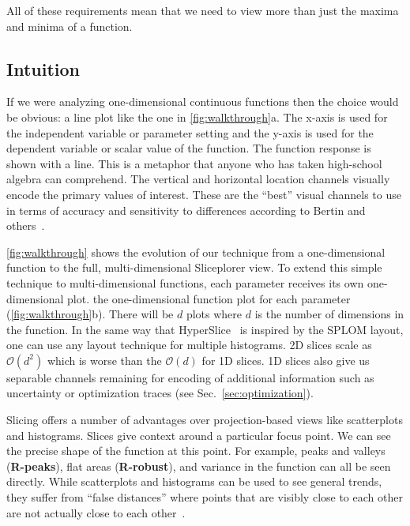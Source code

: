 All of
these requirements mean that we need to view more than just the maxima and
minima of a function.

\subsection{Intuition}

If we were analyzing one-dimensional continuous functions then the choice would
be obvious: a line plot like the one in \autoref{fig:walkthrough}a. The x-axis
is used for the independent variable or parameter setting and the y-axis is
used for the dependent variable or scalar value of the function. The function
response is shown with a line. This is a metaphor that anyone who has taken
high-school algebra can comprehend. The vertical and horizontal location
channels visually encode the primary values of interest. These are the ``best''
visual channels to use in terms of accuracy and sensitivity to differences
according to Bertin and others~\cite{Bertin:1967, Mackinlay:1986}. 

\autoref{fig:walkthrough} shows the evolution
of our technique from a one-dimensional function to the full, multi-dimensional
Sliceplorer view.
To extend this simple technique to multi-dimensional functions, each parameter
receives its own one-dimensional plot.
the one-dimensional function plot for each parameter
(\autoref{fig:walkthrough}b). 
There will be \(d\) plots where \(d\) is
the number of dimensions in the function. In the same way that
HyperSlice~\cite{Wijk:1993} is inspired by the SPLOM layout, one can use any
layout technique for multiple histograms. 2D slices scale as $\mathcal{O}(d^2)$
which is worse than the $\mathcal{O}(d)$ for 1D slices. 
1D slices also give us separable channels remaining for encoding of additional
information such as uncertainty or optimization traces (see
Sec.~\ref{sec:optimization}).

Slicing offers a number of advantages over projection-based views like
scatterplots and histograms. Slices give context around a particular focus
point. We can see the precise shape of the function at this point.  For
example, peaks and valleys (\textbf{R-peaks}), flat areas (\textbf{R-robust}),
and variance in the function can all be seen directly.  While scatterplots and
histograms can be used to see general trends, they suffer from ``false
distances'' where points that are visibly close to each other are not actually
close to each other~\cite{Wilkinson:2018}. 

